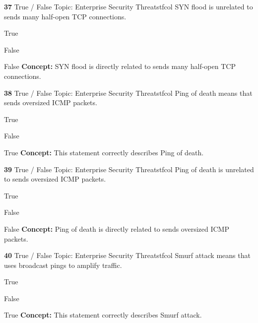 \documentclass[10pt,a4paper]{article}
\begin{document}
\begin{qcard}{\color{white}\textbf{37} \hfill \small True / False \textbar{} Topic: Enterprise Security Threats}{tfcol}
SYN flood is unrelated to sends many half-open TCP connections.

\begin{qoptions}
\item True
\item False
\end{qoptions}
\begin{explainbox}{False}
\textbf{Concept:} SYN flood is directly related to sends many half-open TCP connections.
\end{explainbox}
\end{qcard}

\begin{qcard}{\color{white}\textbf{38} \hfill \small True / False \textbar{} Topic: Enterprise Security Threats}{tfcol}
Ping of death means that sends oversized ICMP packets.

\begin{qoptions}
\item True
\item False
\end{qoptions}
\begin{explainbox}{True}
\textbf{Concept:} This statement correctly describes Ping of death.
\end{explainbox}
\end{qcard}

\begin{qcard}{\color{white}\textbf{39} \hfill \small True / False \textbar{} Topic: Enterprise Security Threats}{tfcol}
Ping of death is unrelated to sends oversized ICMP packets.

\begin{qoptions}
\item True
\item False
\end{qoptions}
\begin{explainbox}{False}
\textbf{Concept:} Ping of death is directly related to sends oversized ICMP packets.
\end{explainbox}
\end{qcard}

\begin{qcard}{\color{white}\textbf{40} \hfill \small True / False \textbar{} Topic: Enterprise Security Threats}{tfcol}
Smurf attack means that uses broadcast pings to amplify traffic.

\begin{qoptions}
\item True
\item False
\end{qoptions}
\begin{explainbox}{True}
\textbf{Concept:} This statement correctly describes Smurf attack.
\end{explainbox}
\end{qcard}
\end{document}
